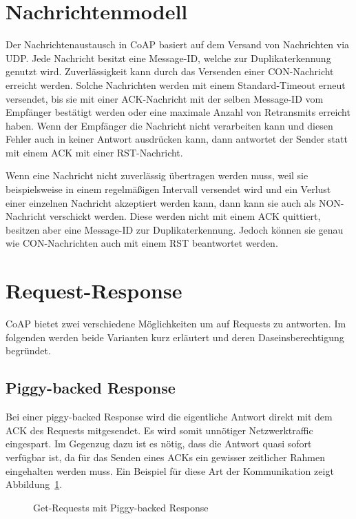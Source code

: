 \section{Nachrichtenmodell}

Der Nachrichtenaustausch in \ac{CoAP} basiert auf dem Versand von Nachrichten
via \ac{UDP}.
Jede Nachricht besitzt eine Message-ID, welche zur Duplikaterkennung genutzt
wird.
Zuverlässigkeit kann durch das Versenden einer \acf{CON}-Nachricht erreicht
werden.
Solche Nachrichten werden mit einem Standard-Timeout erneut versendet, bis sie
mit einer \ac{ACK}-Nachricht mit der selben Message-ID vom Empfänger bestätigt
werden oder eine maximale Anzahl von Retransmits erreicht haben.
Wenn der Empfänger die Nachricht nicht verarbeiten kann und diesen Fehler auch
in keiner Antwort ausdrücken kann, dann antwortet der Sender statt mit einem
\ac{ACK} mit einer \acf{RST}-Nachricht.

Wenn eine Nachricht nicht zuverlässig übertragen werden muss, weil sie beispielsweise in einem
regelmäßigen Intervall versendet wird und ein Verlust einer einzelnen Nachricht akzeptiert werden
kann, dann kann sie auch als \acf{NON}-Nachricht verschickt werden.
Diese werden nicht mit einem \ac{ACK} quittiert, besitzen aber eine Message-ID zur
Duplikaterkennung.
Jedoch können sie genau wie \ac{CON}-Nachrichten auch mit einem \ac{RST} beantwortet werden.

\section{Request-Response}

\ac{CoAP} bietet zwei verschiedene Möglichkeiten um auf Requests zu antworten.
Im folgenden werden beide Varianten kurz erläutert und deren Daseinsberechtigung begründet.

\subsection{Piggy-backed Response}
\label{piggybackedResponse}
Bei einer piggy-backed Response wird die eigentliche Antwort direkt mit dem \ac{ACK} des
Requests mitgesendet. Es wird somit unnötiger Netzwerktraffic eingespart.
Im Gegenzug dazu ist es nötig, dass die Antwort quasi sofort verfügbar ist, da für das Senden eines
\ac{ACK}s ein gewisser zeitlicher Rahmen eingehalten werden muss.
Ein Beispiel für diese Art der Kommunikation zeigt
Abbildung~\ref{fig:twoGetRequestsWithPiggyBacking}.

\begin{figure}[htbp]
    \centering
    \begin{minipage}{0.8\textwidth}
    
    \caption{Get-Requests mit Piggy-backed Response}
    \end{minipage}
    \label{fig:twoGetRequestsWithPiggyBacking}
\end{figure}


